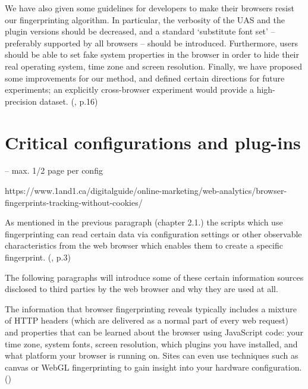 We have also given some guidelines for developers to make their browsers resist
our fingerprinting algorithm. In particular, the verbosity of the UAS and the plugin
versions should be decreased, and a standard ‘substitute font set’ – preferably
supported by all browsers – should be introduced. Furthermore, users should be able
to set fake system properties in the browser in order to hide their real operating
system, time zone and screen resolution.
Finally, we have proposed some improvements for our method, and defined certain
directions for future experiments; an explicitly cross-browser experiment would
provide a high-precision dataset. 
(\textcite{boda11}, p.16)

\newpage
\section{Critical configurations and plug-ins}
-- max. 1/2 page per config

https://www.1and1.ca/digitalguide/online-marketing/web-analytics/browser-fingerprints-tracking-without-cookies/

As mentioned in the previous paragraph (chapter 2.1.) the scripts which use fingerprinting can read certain data via configuration settings or other observable characteristics from the web browser which enables them to create a specific fingerprint. (\textcite{doty18}, p.3)

The following paragraphs will introduce some of these certain information sources disclosed to third parties by the web browser and why they are used at all.


The information that browser fingerprinting reveals typically includes a mixture of HTTP headers (which are delivered as a normal part of every web request) and properties that can be learned about the browser using JavaScript code: your time zone, system fonts, screen resolution, which plugins you have installed, and what platform your browser is running on. Sites can even use techniques such as canvas or WebGL fingerprinting to gain insight into your hardware configuration.(\textcite{miele18})

